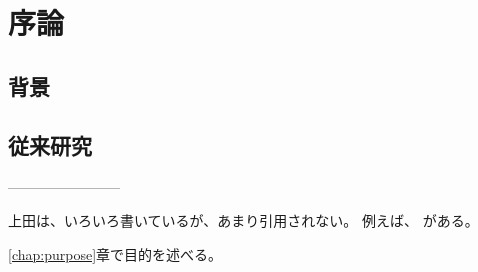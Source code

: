 \chapter{序論}
\section{背景}


\section{従来研究}











------------------------


上田は、いろいろ書いているが、あまり引用されない。
例えば、\cite{上田2015gihyo,ueda2015,上田2015jsai}
がある。

\ref{chap:purpose}章で目的を述べる。

%
